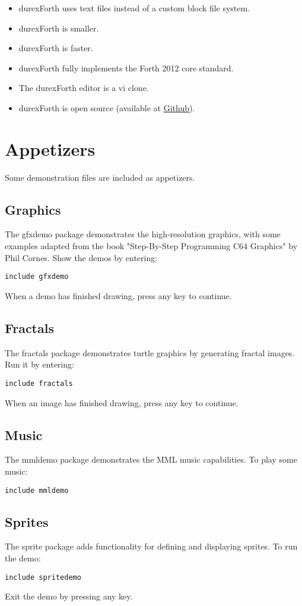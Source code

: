 \begin{itemize}
\item durexForth uses text files instead of a custom block file system.
\item durexForth is smaller.
\item durexForth is faster.
\item durexForth fully implements the Forth 2012 core standard.
\item The durexForth editor is a vi clone.
\item durexForth is open source (available at \href{https://github.com/jkotlinski/durexforth}{Github}).
\end{itemize}

\section{Appetizers}

Some demonstration files are included as appetizers.

\subsection{Graphics}

The gfxdemo package demonstrates the high-resolution graphics, with some examples adapted from the book "Step-By-Step Programming C64 Graphics" by Phil Cornes. 
Show the demos by entering:

\texttt{include gfxdemo}

When a demo has finished drawing, press any key to continue.

\subsection{Fractals}

The fractals package demonstrates turtle graphics by generating fractal images. Run it by entering:

\texttt{include fractals}

When an image has finished drawing, press any key to continue.

\subsection{Music}

The mmldemo package demonstrates the MML music capabilities. To play some music:

\texttt{include mmldemo}

\subsection{Sprites}

The sprite package adds functionality for defining and displaying sprites. To run the demo:

\texttt{include spritedemo}

Exit the demo by pressing any key.
